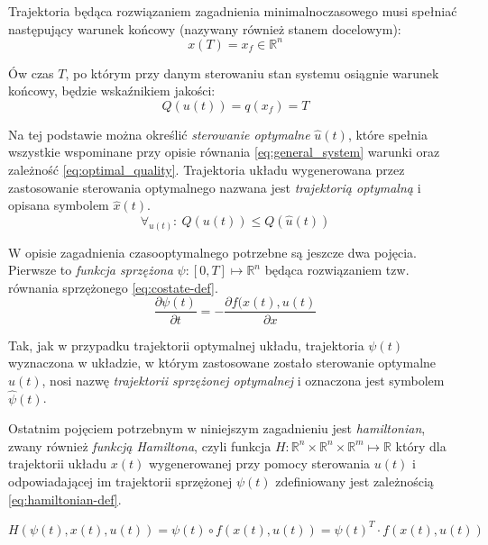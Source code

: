 Trajektoria będąca rozwiązaniem zagadnienia minimalnoczasowego musi spełniać następujący warunek końcowy (nazywany również stanem docelowym):
\begin{equation}\label{eq:final_term}
    x(T) = x_{f} \in \mathbb{R}^{n}
\end{equation}

Ów czas $T$, po którym przy danym sterowaniu stan systemu osiągnie warunek końcowy, będzie wskaźnikiem jakości: 
\begin{equation}\label{eq:quality}
    Q(u(t)) = q(x_{f}) = T
\end{equation}

Na tej podstawie można określić \emph{sterowanie optymalne} $\hat{u}(t)$, które spełnia wszystkie wspominane przy opisie równania \ref{eq:general_system} warunki oraz zależność \ref{eq:optimal_quality}. Trajektoria układu wygenerowana przez zastosowanie sterowania optymalnego nazwana jest \emph{trajektorią optymalną} i opisana symbolem $\hat{x}(t)$.
\begin{equation}\label{eq:optimal_quality}
    \forall_{u(t)}:~ Q(u(t)) \leq Q(\hat{u}(t))
\end{equation}

W opisie zagadnienia czasooptymalnego potrzebne są jeszcze dwa pojęcia.
Pierwsze to \emph{funkcja sprzężona} $\psi: [0, T] \longmapsto \mathbb{R}^{n}$ będąca rozwiązaniem tzw. równania sprzężonego \ref{eq:costate-def}.
\begin{equation}\label{eq:costate-def}
\frac{\partial \psi(t)}{\partial t} = - \frac{\partial f(x(t), u(t)}{\partial x}
\end{equation}

Tak, jak w przypadku trajektorii optymalnej układu, trajektoria $\psi(t)$ wyznaczona w układzie, w którym zastosowane zostało sterowanie optymalne $\hat{u}(t)$, nosi nazwę \emph{trajektorii sprzężonej optymalnej} i oznaczona jest symbolem $\hat{\psi}(t)$.

Ostatnim pojęciem potrzebnym w niniejszym zagadnieniu jest \emph{hamiltonian}, zwany również \emph{funkcją Hamiltona}, czyli funkcja $H: \mathbb{R}^{n} \times \mathbb{R}^{n} \times \mathbb{R}^{m} \longmapsto \mathbb{R}$ który dla trajektorii układu $x(t)$ wygenerowanej przy pomocy sterowania $u(t)$ i odpowiadającej im trajektorii sprzężonej $\psi(t)$ zdefiniowany jest zależnością \ref{eq:hamiltonian-def}.

\begin{equation}\label{eq:hamiltonian-def}
H(\psi(t), x(t), u(t)) = \psi(t) \circ f(x(t), u(t)) = \psi(t)^{T} \cdot f(x(t), u(t))
\end{equation}

